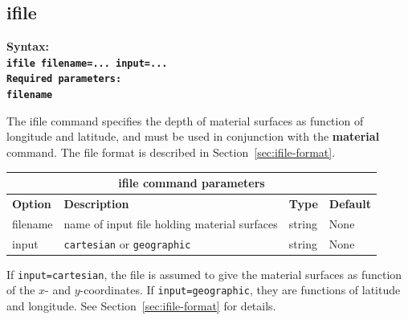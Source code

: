 \documentclass[11pt]{report}
\begin{document}

\subsection{ifile}
\label{keyword:ifile}
\begin{flushleft}\bf
Syntax:\\
\tt ifile filename=... input=...\\
\bf Required parameters:\\
\tt filename
\end{flushleft}
The ifile command specifies the depth of material surfaces as function of longitude and latitude,
and must be used in conjunction with the {\bf material} command. The file format is
described in Section~\ref{sec:ifile-format}.
\begin{center}
\begin{tabular}{|l|p{8cm}|l|l|} \hline
\multicolumn{4}{|c|}{\bf ifile command parameters}\\ \hline
\bf{Option} & \bf{Description} & \bf{Type} & \bf{Default} \\ \hline \hline
filename & name of input file holding material surfaces & string & None  \\ \hline
input & {\tt cartesian} or {\tt geographic} & string & None  \\ \hline
\end{tabular}
\end{center}
If {\tt input=cartesian}, the file is assumed to give the material surfaces as function of the $x$-
and $y$-coordinates. If {\tt input=geographic}, they are functions of latitude and longitude. See
Section~\ref{sec:ifile-format} for details.

\end{document}
